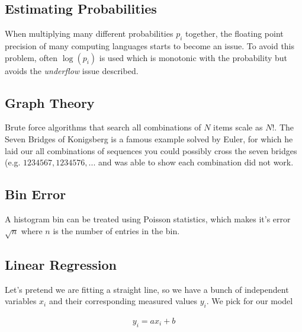 \subsection{Estimating Probabilities}
When multiplying many different probabilities $p_i$ together, the floating point precision of many computing languages starts to become an issue. To avoid this problem, often $\log(p_i)$ is used which is monotonic with the probability but avoids the \textit{underflow} issue described.

\subsection{Graph Theory}
Brute force algorithms that search all combinations of $N$ items scale as $N!$. The Seven Bridges of Konigsberg is a famous example solved by Euler, for which he laid our all combinations of sequences you could possibly cross the seven bridges (e.g. $1234567, 1234576,...$ and was able to show each combination did not work.

\subsection{Bin Error}
A histogram bin can be treated using Poisson statistics, which makes it's error $\sqrt{n}$ where $n$ is the number of entries in the bin.


\subsection{Linear Regression}\label{least-squares}
Let's pretend we are fitting a straight line, so we have a bunch of independent variables $x_i$ and their corresponding measured values $y_i$. We pick for our model

\begin{align}
y_i = ax_i + b
\end{align}

